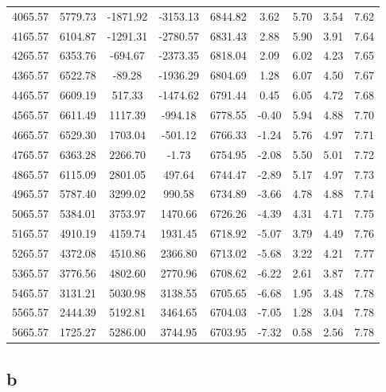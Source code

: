 \begin{center}
\begin{longtable}{|c|c|c|c|c|c|c|c|c|}
    4065.57 & 5779.73 & -1871.92 & -3153.13  & 6844.82 & 3.62 &  5.70 &  3.54 & 7.62 \\ 
    4165.57 & 6104.87 & -1291.31 & -2780.57  & 6831.43 & 2.88 &  5.90 &  3.91 & 7.64 \\ 
    4265.57 & 6353.76 & -694.67 & -2373.35  & 6818.04 & 2.09 &  6.02 &  4.23 & 7.65 \\ 
    4365.57 & 6522.78 & -89.28 & -1936.29  & 6804.69 & 1.28 &  6.07 &  4.50 & 7.67 \\ 
    4465.57 & 6609.19 & 517.33 & -1474.62  & 6791.44 & 0.45 &  6.05 &  4.72 & 7.68 \\ 
    4565.57 & 6611.49 & 1117.39 & -994.18  & 6778.55 & -0.40 &  5.94 &  4.88 & 7.70 \\ 
    4665.57 & 6529.30 & 1703.04 & -501.12  & 6766.33 & -1.24 &  5.76 &  4.97 & 7.71 \\ 
    4765.57 & 6363.28 & 2266.70 & -1.73  & 6754.95 & -2.08 &  5.50 &  5.01 & 7.72 \\ 
    4865.57 & 6115.09 & 2801.05 & 497.64  & 6744.47 & -2.89 &  5.17 &  4.97 & 7.73 \\ 
    4965.57 & 5787.40 & 3299.02 & 990.58  & 6734.89 & -3.66 &  4.78 &  4.88 & 7.74 \\ 
    5065.57 & 5384.01 & 3753.97 & 1470.66  & 6726.26 & -4.39 &  4.31 &  4.71 & 7.75 \\ 
    5165.57 & 4910.19 & 4159.74 & 1931.45  & 6718.92 & -5.07 &  3.79 &  4.49 & 7.76 \\ 
    5265.57 & 4372.08 & 4510.86 & 2366.80  & 6713.02 & -5.68 &  3.22 &  4.21 & 7.77 \\ 
    5365.57 & 3776.56 & 4802.60 & 2770.96  & 6708.62 & -6.22 &  2.61 &  3.87 & 7.77 \\ 
    5465.57 & 3131.21 & 5030.98 & 3138.55  & 6705.65 & -6.68 &  1.95 &  3.48 & 7.78 \\ 
    5565.57 & 2444.39 & 5192.81 & 3464.65  & 6704.03 & -7.05 &  1.28 &  3.04 & 7.78 \\ 
    5665.57 & 1725.27 & 5286.00 & 3744.95  & 6703.95 & -7.32 &  0.58 &  2.56 & 7.78 \\ 
   
    \end{longtable}
    \end{center}

    \subsection{b}

